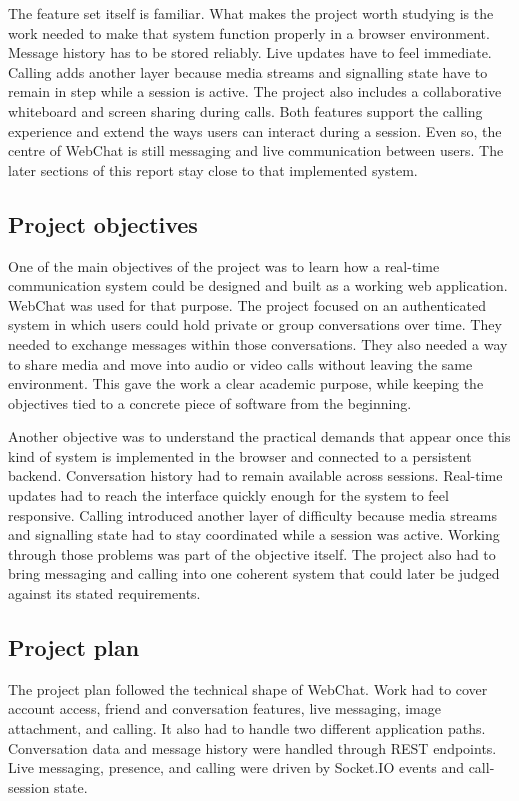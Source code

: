 \documentclass[12pt,a4paper]{article}
\begin{document}
The feature set itself is familiar. What makes the project worth studying is the work needed to make that system function properly in a browser environment. Message history has to be stored reliably. Live updates have to feel immediate. Calling adds another layer because media streams and signalling state have to remain in step while a session is active. The project also includes a collaborative whiteboard and screen sharing during calls. Both features support the calling experience and extend the ways users can interact during a session. Even so, the centre of WebChat is still messaging and live communication between users. The later sections of this report stay close to that implemented system.

\subsection{Project objectives}
One of the main objectives of the project was to learn how a real-time communication system could be designed and built as a working web application. WebChat was used for that purpose. The project focused on an authenticated system in which users could hold private or group conversations over time. They needed to exchange messages within those conversations. They also needed a way to share media and move into audio or video calls without leaving the same environment. This gave the work a clear academic purpose, while keeping the objectives tied to a concrete piece of software from the beginning.

Another objective was to understand the practical demands that appear once this kind of system is implemented in the browser and connected to a persistent backend. Conversation history had to remain available across sessions. Real-time updates had to reach the interface quickly enough for the system to feel responsive. Calling introduced another layer of difficulty because media streams and signalling state had to stay coordinated while a session was active. Working through those problems was part of the objective itself. The project also had to bring messaging and calling into one coherent system that could later be judged against its stated requirements.

\subsection{Project plan}
The project plan followed the technical shape of WebChat. Work had to cover account access, friend and conversation features, live messaging, image attachment, and calling. It also had to handle two different application paths. Conversation data and message history were handled through REST endpoints. Live messaging, presence, and calling were driven by Socket.IO events and call-session state.
\end{document}
